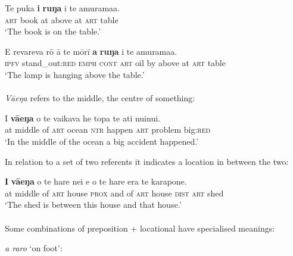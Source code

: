 \ea\label{ex:3.146}
\gll Te puka \textbf{{\ꞌ}i} \textbf{ruŋa} i te {\ꞌ}amurama{\ꞌ}a. \\
\textsc{art} book at above at \textsc{art} table \\

\glt 
‘The book is on the table.’ \textstyleExampleref{[Notes]}
\z

\ea\label{ex:3.147}
\gll E revareva rō {\ꞌ}ā te mōrī \textbf{a} \textbf{ruŋa} i te {\ꞌ}amurama{\ꞌ}a. \\
\textsc{ipfv} stand\_out:\textsc{red} \textsc{emph} \textsc{cont} \textsc{art} oil by above at \textsc{art} table \\

\glt 
‘The lamp is hanging above the table.’ \textstyleExampleref{[Notes]}
\z

\paragraph{}\label{sec:3.6.2.3.4} \textit{Vāeŋa} refers to the middle, the centre of something: 

\ea\label{ex:3.148}
\gll {\ꞌ}I \textbf{vāeŋa} o te vaikava he topa te {\ꞌ}ati nuinui.\\
at middle of \textsc{art} ocean \textsc{ntr} happen \textsc{art} problem big:\textsc{red}\\

\glt
‘In the middle of the ocean a big accident happened.’ \textstyleExampleref{[Fel-40-026]}
\z

In relation to a set of two referents it indicates a location in between the two:

\ea\label{ex:3.149}
\gll \textbf{{\ꞌ}I} \textbf{vāeŋa} o te hare nei {\ꞌ}e o te hare era te karapone. \\
at middle of \textsc{art} house \textsc{prox} and of \textsc{art} house \textsc{dist} \textsc{art} shed \\

\glt
‘The shed is between this house and that house.’ \textstyleExampleref{[Notes]}
\z

\paragraph{}\label{sec:3.6.2.3.5} Some combinations of preposition + locational have specialised meanings:

\smallskip 

\textit{a raro} ‘on foot’:

